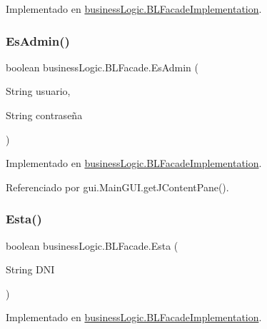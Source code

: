 Implementado en \mbox{\hyperlink{classbusinessLogic_1_1BLFacadeImplementation_a05d93749b9cdaabcda23a8e6299fdf7d}{business\+Logic.\+B\+L\+Facade\+Implementation}}.

\mbox{\label{interfacebusinessLogic_1_1BLFacade_abd1601649b5bd94bd61c5c2a4893c734}} 
\subsubsection{\texorpdfstring{EsAdmin()}{EsAdmin()}}
{\footnotesize\ttfamily boolean business\+Logic.\+B\+L\+Facade.\+Es\+Admin (\begin{DoxyParamCaption}\item[{String}]{usuario,  }\item[{String}]{contraseña }\end{DoxyParamCaption})}



Implementado en \mbox{\hyperlink{classbusinessLogic_1_1BLFacadeImplementation_a1fd11ce02084c04c70d667efb94167d0}{business\+Logic.\+B\+L\+Facade\+Implementation}}.



Referenciado por gui.\+Main\+G\+U\+I.\+get\+J\+Content\+Pane().

\mbox{\label{interfacebusinessLogic_1_1BLFacade_a6d1b585be500b872823e516cc30929ee}} 
\subsubsection{\texorpdfstring{Esta()}{Esta()}}
{\footnotesize\ttfamily boolean business\+Logic.\+B\+L\+Facade.\+Esta (\begin{DoxyParamCaption}\item[{String}]{D\+NI }\end{DoxyParamCaption})}



Implementado en \mbox{\hyperlink{classbusinessLogic_1_1BLFacadeImplementation_ac83572a35820cc3eac9d4a51add5a752}{business\+Logic.\+B\+L\+Facade\+Implementation}}.



